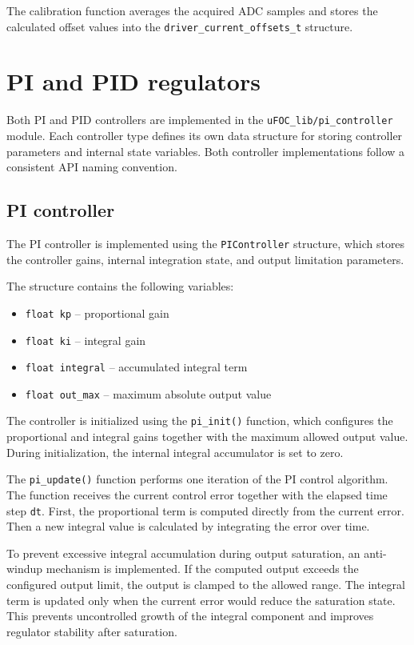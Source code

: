 The calibration function averages the acquired ADC samples and stores the calculated offset values
into the \texttt{driver\_current\_offsets\_t} structure.


\section{PI and PID regulators}

Both PI and PID controllers are implemented in the \texttt{uFOC\_lib/pi\_controller} module.
Each controller type defines its own data structure for storing controller parameters and internal state variables.
Both controller implementations follow a consistent API naming convention.

\subsection{PI controller}

The PI controller is implemented using the \texttt{PIController} structure, which stores the controller gains, internal integration state, and output limitation parameters.

The structure contains the following variables:
\begin{itemize}
    \item \texttt{float kp} -- proportional gain
    \item \texttt{float ki} -- integral gain
    \item \texttt{float integral} -- accumulated integral term
    \item \texttt{float out\_max} -- maximum absolute output value
\end{itemize}

The controller is initialized using the \texttt{pi\_init()} function, which configures the proportional and integral gains together with the maximum allowed output value.
During initialization, the internal integral accumulator is set to zero.

The \texttt{pi\_update()} function performs one iteration of the PI control algorithm.
The function receives the current control error together with the elapsed time step \texttt{dt}.
First, the proportional term is computed directly from the current error.
Then a new integral value is calculated by integrating the error over time.

To prevent excessive integral accumulation during output saturation, an anti-windup mechanism is implemented.
If the computed output exceeds the configured output limit, the output is clamped to the allowed range.
The integral term is updated only when the current error would reduce the saturation state.
This prevents uncontrolled growth of the integral component and improves regulator stability after saturation.

